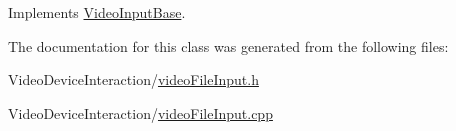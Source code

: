 Implements \hyperlink{class_video_input_base_aff0dba9ff7bebd2d6d3fe55bc6f1c0c0}{Video\+Input\+Base}.



The documentation for this class was generated from the following files\+:\begin{DoxyCompactItemize}
\item 
Video\+Device\+Interaction/\hyperlink{video_file_input_8h}{video\+File\+Input.\+h}\item 
Video\+Device\+Interaction/\hyperlink{video_file_input_8cpp}{video\+File\+Input.\+cpp}\end{DoxyCompactItemize}
